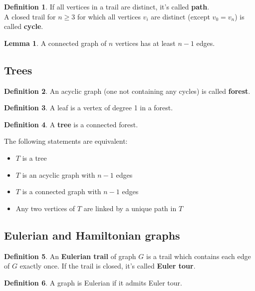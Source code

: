 \documentclass{article}
\theoremstyle{definition}
\newtheorem{lemma}[theorem]{Lemma}
\newtheorem{dd}{Definition}[section]
\begin{document}
\begin{dd}
    If all vertices in a trail are distinct, it's called \textbf{path}. \\
    A closed trail for $n \geq 3$ for which all vertices $v_i$ are distinct (except $v_0 = v_n$) is called \textbf{cycle}.
\end{dd}

\begin{lemma}
    A connected graph of $n$ vertices has at least $n - 1$ edges.
\end{lemma}

\subsection{Trees}

\begin{dd}
    An acyclic graph (one not containing any cycles) is called \textbf{forest}.
\end{dd}

\begin{dd}
    A leaf is a vertex of degree 1 in a forest.
\end{dd}

\begin{dd}
    A \textbf{tree} is a connected forest.
\end{dd}

\noindent The following statements are equivalent:
\begin{itemize}
    \item $T$ is a tree
    \item $T$ is an acyclic graph with $n - 1$ edges
    \item $T$ is a connected graph with $n - 1$ edges
    \item Any two vertices of $T$ are linked by a unique path in $T$
\end{itemize}

\subsection{Eulerian and Hamiltonian graphs}

\begin{dd}
    An \textbf{Eulerian trail} of graph $G$ is a trail which contains each edge of $G$ exactly once. If the trail is closed, it's called \textbf{Euler tour}.
\end{dd}

\begin{dd}
    A graph is Eulerian if it admits Euler tour.
\end{dd}
\end{document}
